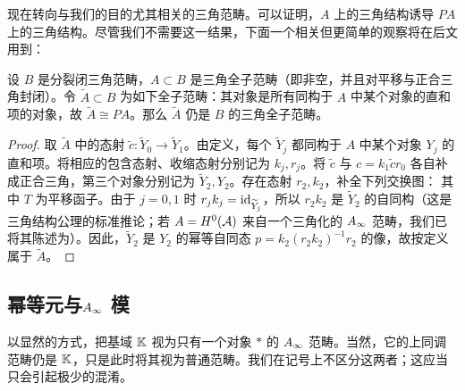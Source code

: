 现在转向与我们的目的尤其相关的三角范畴。可以证明，$A$ 上的三角结构诱导 $PA$ 上的三角结构。尽管我们不需要这一结果，下面一个相关但更简单的观察将在后文用到：
\begin{lemma}\label{st:4.1}
设 $B$ 是分裂闭三角范畴，$A\subset B$ 是三角全子范畴（即非空，并且对平移与正合三角封闭）。令 $\widetilde A\subset B$ 为如下全子范畴：其对象是所有同构于 $A$ 中某个对象的直和项的对象，故 $\widetilde A\cong PA$。那么 $\widetilde A$ 仍是 $B$ 的三角全子范畴。
\end{lemma}
\begin{proof}
取 $\widetilde A$ 中的态射 $\tilde c:\widetilde Y_0\to\widetilde Y_1$。由定义，每个 $\widetilde Y_j$ 都同构于 $A$ 中某个对象 $Y_j$ 的直和项。将相应的包含态射、收缩态射分别记为 $k_j,r_j$。将 $\tilde c$ 与 $c=k_1\tilde c r_0$ 各自补成正合三角，第三个对象分别记为 $\widetilde Y_2,Y_2$。存在态射 $r_2,k_2$，补全下列交换图：
其中 $T$ 为平移函子。由于 $j=0,1$ 时 $r_jk_j=\operatorname{id}_{\widetilde Y_j}$，所以 $r_2k_2$ 是 $\widetilde Y_2$ 的自同构（这是三角结构公理的标准推论；若 $A=H^0(\mathcal A)$ 来自一个三角化的 $A_\infty$ 范畴，我们已将其陈述为）。因此，$\widetilde Y_2$ 是 $Y_2$ 的幂等自同态 $p=k_2(r_2k_2)^{-1}r_2$ 的像，故按定义属于 $\widetilde A$。
\end{proof}

\subsection{幂等元与\texorpdfstring{$A_\infty$}{A∞} 模}\label{sec:4b}
以显然的方式，把基域 $\mathbb K$ 视为只有一个对象 $*$ 的 $A_\infty$ 范畴。当然，它的上同调范畴仍是 $\mathbb K$，只是此时将其视为普通范畴。我们在记号上不区分这两者；这应当只会引起极少的混淆。

